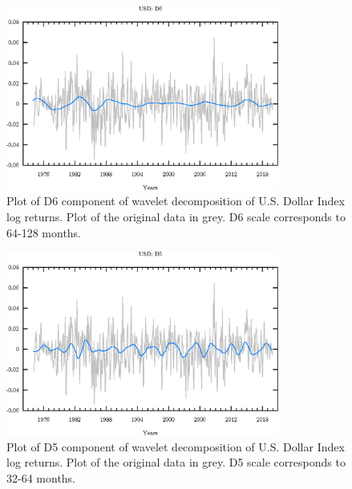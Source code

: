 \begin{figure}
\begin{center}
\includegraphics[width=0.8\textwidth]{./code/plot/usd_wr_D6.eps}
\caption{Plot of D6 component of wavelet decomposition of U.S. Dollar Index log returns. 
	Plot of the original data in grey. D6 scale corresponds to 64-128 months.}
\label{fig:usd-wr-d6}
\end{center}
\end{figure}

\begin{figure}
\begin{center}
\includegraphics[width=0.8\textwidth]{./code/plot/usd_wr_D5.eps}
\caption{Plot of D5 component of wavelet decomposition of U.S. Dollar Index log returns. 
	Plot of the original data in grey. D5 scale corresponds to 32-64 months.}
\label{fig:usd-wr-d5}
\end{center}
\end{figure}

